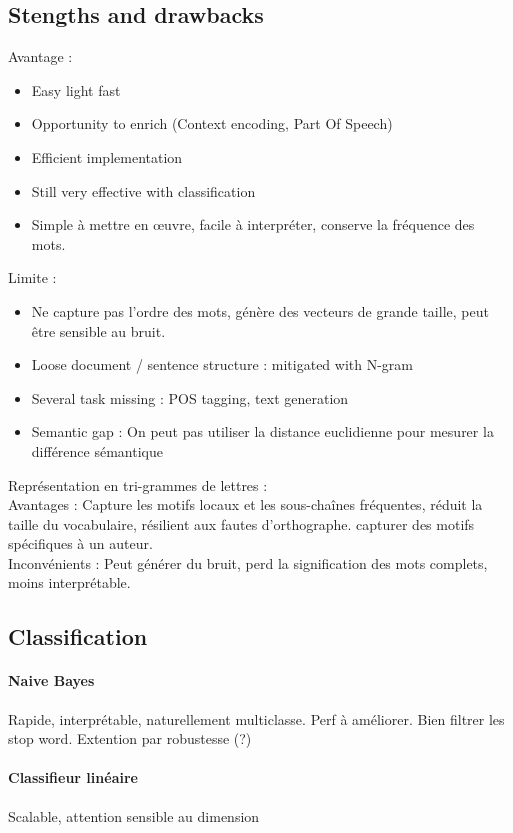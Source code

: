 \documentclass{article}
\theoremstyle{plain}%
\theoremstyle{definition}
\theoremstyle{remark}
\begin{document}
\subsection{Stengths and drawbacks}
Avantage : 
\begin{itemize}
    \item Easy light fast 
    \item Opportunity to enrich (Context encoding, Part Of Speech)
    \item Efficient implementation
    \item Still very effective with classification
    \item Simple à mettre en œuvre, facile à interpréter, conserve la fréquence des mots.
\end{itemize}
Limite : 
\begin{itemize}
    \item Ne capture pas l'ordre des mots, génère des vecteurs de grande taille, peut être sensible au bruit.
    \item Loose document / sentence structure : mitigated with N-gram
    \item Several task missing : POS tagging, text generation
    \item Semantic gap : On peut pas utiliser la distance euclidienne pour mesurer la différence sémantique
\end{itemize}
Représentation en tri-grammes de lettres :\\
Avantages : Capture les motifs locaux et les sous-chaînes fréquentes, réduit la taille du vocabulaire, résilient aux fautes d'orthographe. capturer des motifs spécifiques à un auteur.\\
Inconvénients : Peut générer du bruit, perd la signification des mots complets, moins interprétable.

\subsection{Classification}
\paragraph*{Naive Bayes}
Rapide, interprétable, naturellement multiclasse. Perf à améliorer. Bien filtrer les stop word. Extention par robustesse (?)

\paragraph*{Classifieur linéaire}
Scalable, attention sensible au dimension
\end{document}
